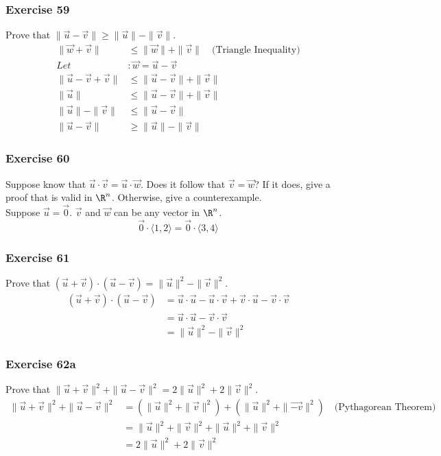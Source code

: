 \documentclass{math}
\begin{document}
\subsubsection*{Exercise 59}
Prove that \( \|\vec{u}-\vec{v}\| \ge \|\vec{u}\|-\|\vec{v}\| \).
\begin{align*}
  \|\vec{w}+\vec{v}\| &\le \|\vec{w}\|+\|\vec{v}\|
    \quad\text{(Triangle Inequality)} \\
  Let&: \vec{w} = \vec{u}-\vec{v} \\
  \|\vec{u}-\vec{v}+\vec{v}\| &\le \|\vec{u}-\vec{v}\|+\|\vec{v}\| \\
  \|\vec{u}\| &\le \|\vec{u}-\vec{v}\|+\|\vec{v}\| \\
  \|\vec{u}\|-\|\vec{v}\| &\le \|\vec{u}-\vec{v}\| \\
  \|\vec{u}-\vec{v}\| &\ge \|\vec{u}\|-\|\vec{v}\|
\end{align*}

\subsubsection*{Exercise 60}
Suppose know that \( \vec{u}\cdot\vec{v} = \vec{u}\cdot\vec{w} \). Does it
follow that \( \vec{v} = \vec{w} \)? If it does, give a proof that is valid
in \( \R^n \). Otherwise, give a counterexample. \\
Suppose \( \vec{u} = \vec{0} \). \( \vec{v} \) and \( \vec{w} \) can be any
vector in \( \R^n \).
\[ \vec{0}\cdot\langle1,2\rangle = \vec{0}\cdot\langle3,4\rangle \]

\subsubsection*{Exercise 61}
Prove that \( (\vec{u}+\vec{v})\cdot(\vec{u}-\vec{v}) =
\|\vec{u}\|^2-\|\vec{v}\|^2 \).
\begin{align*}
  (\vec{u}+\vec{v})\cdot(\vec{u}-\vec{v}) &= \vec{u}\cdot\vec{u}-
    \vec{u}\cdot\vec{v}+\vec{v}\cdot\vec{u}-\vec{v}\cdot\vec{v} \\
  &= \vec{u}\cdot\vec{u}-\vec{v}\cdot\vec{v} \\
  &= \|\vec{u}\|^2-\|\vec{v}\|^2
\end{align*}

\subsubsection*{Exercise 62a}
Prove that \( \|\vec{u}+\vec{v}\|^2+\|\vec{u}-\vec{v}\|^2 = 2\|\vec{u}\|^2+
2\|\vec{v}\|^2 \).
\begin{align*}
  \|\vec{u}+\vec{v}\|^2+\|\vec{u}-\vec{v}\|^2 &=
    (\|\vec{u}\|^2+\|\vec{v}\|^2)+(\|\vec{u}\|^2+\|\vec{-v}\|^2)
    \quad\text{(Pythagorean Theorem)} \\
  &= \|\vec{u}\|^2+\|\vec{v}\|^2+\|\vec{u}\|^2+\|\vec{v}\|^2 \\
  &= 2\|\vec{u}\|^2+2\|\vec{v}\|^2
\end{align*}
\end{document}
